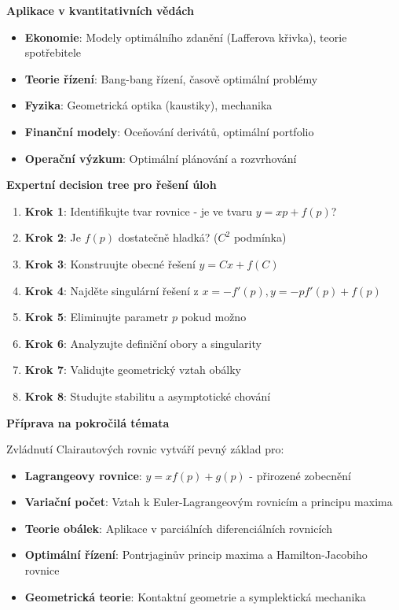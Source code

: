 \vspace{1\baselineskip}

\noindent\textbf{Aplikace v kvantitativních vědách}

\begin{itemize}
\item \textbf{Ekonomie}: Modely optimálního zdanění (Lafferova křivka), teorie spotřebitele
\item \textbf{Teorie řízení}: Bang-bang řízení, časově optimální problémy
\item \textbf{Fyzika}: Geometrická optika (kaustiky), mechanika
\item \textbf{Finanční modely}: Oceňování derivátů, optimální portfolio
\item \textbf{Operační výzkum}: Optimální plánování a rozvrhování
\end{itemize}

\vspace{1\baselineskip}

\noindent\textbf{Expertní decision tree pro řešení úloh}

\begin{enumerate}
\item \textbf{Krok 1}: Identifikujte tvar rovnice - je ve tvaru $y = xp + f(p)$?
\item \textbf{Krok 2}: Je $f(p)$ dostatečně hladká? ($C^2$ podmínka)
\item \textbf{Krok 3}: Konstruujte obecné řešení $y = Cx + f(C)$
\item \textbf{Krok 4}: Najděte singulární řešení z $x = -f'(p), y = -pf'(p) + f(p)$
\item \textbf{Krok 5}: Eliminujte parametr $p$ pokud možno
\item \textbf{Krok 6}: Analyzujte definiční obory a singularity
\item \textbf{Krok 7}: Validujte geometrický vztah obálky
\item \textbf{Krok 8}: Studujte stabilitu a asymptotické chování
\end{enumerate}

\vspace{1\baselineskip}

\noindent\textbf{Příprava na pokročilá témata}

Zvládnutí Clairautových rovnic vytváří pevný základ pro:
\begin{itemize}
\item \textbf{Lagrangeovy rovnice}: $y = xf(p) + g(p)$ - přirozené zobecnění
\item \textbf{Variační počet}: Vztah k Euler-Lagrangeovým rovnicím a principu maxima
\item \textbf{Teorie obálek}: Aplikace v parciálních diferenciálních rovnicích
\item \textbf{Optimální řízení}: Pontrjaginův princip maxima a Hamilton-Jacobiho rovnice
\item \textbf{Geometrická teorie}: Kontaktní geometrie a symplektická mechanika
\end{itemize}

